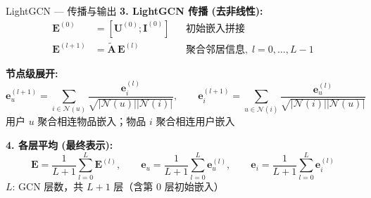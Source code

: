 \documentclass[9pt, aspectratio=169]{ctexbeamer}
\begin{document}
\begin{frame}{LightGCN --- 传播与输出}
  \textbf{3. LightGCN 传播 (去非线性):}
  \begin{align*}
    \mathbf{E}^{(0)} &= [\mathbf{U}^{(0)}; \mathbf{I}^{(0)}] &&\text{初始嵌入拼接} \\
    \mathbf{E}^{(l+1)} &= \tilde{\mathbf{A}}\,\mathbf{E}^{(l)} &&\text{聚合邻居信息},\; l=0,\dots,L-1
  \end{align*}

  \textbf{节点级展开:}
  \begin{equation*}
    \mathbf{e}_u^{(l+1)} = \sum_{i\in\mathcal{N}(u)}\frac{\mathbf{e}_i^{(l)}}{\sqrt{|\mathcal{N}(u)||\mathcal{N}(i)|}},\qquad
    \mathbf{e}_i^{(l+1)} = \sum_{u\in\mathcal{N}(i)}\frac{\mathbf{e}_u^{(l)}}{\sqrt{|\mathcal{N}(i)||\mathcal{N}(u)|}}
  \end{equation*}
  用户 $u$ 聚合相连物品嵌入；物品 $i$ 聚合相连用户嵌入

  \vspace{0.3em}
  \textbf{4. 各层平均 (最终表示):}
  \begin{equation*}
    \mathbf{E} = \frac{1}{L+1}\sum_{l=0}^{L}\mathbf{E}^{(l)},\qquad
    \mathbf{e}_u = \frac{1}{L+1}\sum_{l=0}^{L}\mathbf{e}_u^{(l)},\qquad
    \mathbf{e}_i = \frac{1}{L+1}\sum_{l=0}^{L}\mathbf{e}_i^{(l)}
  \end{equation*}
  $L$: GCN 层数，共 $L+1$ 层（含第 0 层初始嵌入）
\end{frame}

\end{document}
